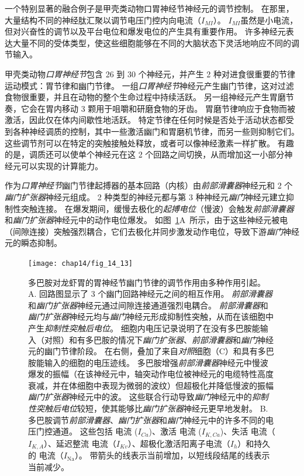 一个特别显著的融合例子是甲壳类动物口胃神经节神经元的调节控制。
在那里，大量结构不同的神经肽汇聚以调节电压门控内向电流（$I_{MI}$）。
$I_{MI}$虽然是小电流，但对兴奋性的调节以及平台电位和爆发电位的产生具有重要作用。
许多神经元表达大量不同的受体类型，使这些细胞能够在不同的大脑状态下灵活地响应不同的调节输入。


甲壳类动物\textit{口胃神经节}包含 26 到 30 个神经元，并产生 2 种对进食很重要的节律运动模式：胃节律和幽门节律。
一组\textit{口胃神经节}神经元产生幽门节律，这对过滤食物很重要，并且在动物的整个生命过程中持续活跃。
另一组神经元产生胃磨节奏，它会在胃内移动 3 颗用于咀嚼和研磨食物的牙齿。
胃磨节律响应于食物而被激活，因此仅在体内间歇性地活跃。
特定节律在任何时候是否处于活动状态都受到各种神经调质的控制，其中一些激活幽门和胃磨机节律，而另一些则抑制它们。
这些调节剂可以在特定的突触接触处释放，或者可以像神经激素一样扩散。
有趣的是，调质还可以使单个神经元在这 2 个回路之间切换，从而增加这一小部分神经元可以实现的计算能力。


作为\textit{口胃神经节}幽门节律起搏器的基本回路（内核）由\textit{前部滑囊器}神经元和 2 个\textit{幽门扩张器}神经元组成。
2 种类型的神经元都与第 3 种神经元\textit{幽门}神经元建立抑制性突触连接。
在爆发期间，缓慢去极化的\textit{起搏电位}（慢波）会触发\textit{前部滑囊器}和\textit{幽门扩张器}神经元中的动作电位爆发。
如图~\ref{fig:14_13}A~所示，由于这些神经元被电（间隙连接）突触强烈耦合，它们去极化并同步激发动作电位，导致下游\textit{幽门}神经元的瞬态抑制。


\begin{figure}[htbp]
	\centering
	\texttt{[image: chap14/fig\_14\_13]}
	\caption{多巴胺对龙虾胃的胃神经节幽门节律的调节作用由多种作用引起。
		A. 回路图显示了 3 个幽门回路神经元之间的相互作用。
		\textit{前部滑囊器}和\textit{幽门扩张器}神经元通过间隙连接通道强烈电耦合。
		\textit{前部滑囊器}和\textit{幽门扩张器}神经元均与\textit{幽门}神经元形成抑制性突触，从而在该细胞中产生\textit{抑制性突触后电位}。
		细胞内电压记录说明了在没有多巴胺能输入（对照）和有多巴胺的情况下\textit{幽门扩张器}、\textit{前部滑囊器}和\textit{幽门}神经元的幽门节律阶段。
		在右侧，叠加了来自\textit{对照}细胞（C）和具有多巴胺能输入的细胞的电压迹线。
		多巴胺增强\textit{前部滑囊器}神经元中慢波爆发的振幅（在该神经元中，轴突动作电位被神经元的电缆特性高度衰减，并在体细胞中表现为微弱的波纹）但超极化并降低慢波的振幅\textit{幽门扩张器}神经元中的波。
		这些联合行动导致\textit{幽门}神经元中的\textit{抑制性突触后电位}较短，使其能够比\textit{幽门扩张器}神经元更早地发射\cite{eisen1984mechanism}。
		B. 多巴胺调节\textit{前部滑囊器}、\textit{幽门扩张器}和\textit{幽门}神经元中的许多不同的电压门控通道。
		这些包括  电流 ($I_{Ca}$)、激活  电流 ($I_{K,Ca}$)、失活  电流（$I_{K,A}$）、延迟整流  电流（$I_{Kv}$）、超极化激活阳离子电流（$I_h$）和持久的  电流（$I_\text{Na}$）。
		带箭头的线表示当前增加，以短线段结尾的线表示当前减少\cite{marder2007understanding,harris2011neuromodulation}。}
	\label{fig:14_13}
\end{figure}


